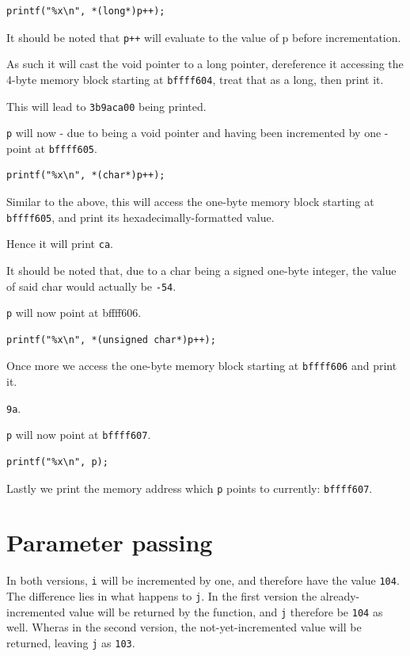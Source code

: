 \documentclass[a4paper]{scrartcl}
\begin{document}
\begin{lstlisting}
printf("%x\n", *(long*)p++);
\end{lstlisting}

It should be noted that \texttt{p++} will evaluate to the value of p before incrementation.

As such it will cast the void pointer to a long pointer, dereference it
accessing the 4-byte memory block starting at \texttt{bffff604}, treat that as
a long, then print it.

This will lead to \texttt{3b9aca00} being printed.

\texttt{p} will now - due to being a void pointer and having been incremented
by one - point at \texttt{bffff605}.

\begin{lstlisting}
printf("%x\n", *(char*)p++);
\end{lstlisting}

Similar to the above, this will access the one-byte memory block starting at
\texttt{bffff605}, and print its hexadecimally-formatted value.

Hence it will print \texttt{ca}.

It should be noted that, due to a char being a signed one-byte integer, the
value of said char would actually be \texttt{-54}. 

\texttt{p} will now point at {bffff606}.

\begin{lstlisting}
printf("%x\n", *(unsigned char*)p++);
\end{lstlisting}

Once more we access the one-byte memory block starting at \texttt{bffff606} and
print it.

\texttt{9a}.

\texttt{p} will now point at \texttt{bffff607}.

\begin{lstlisting}
printf("%x\n", p);
\end{lstlisting}

Lastly we print the memory address which \texttt{p} points to currently:
\texttt{bffff607}.

\section{Parameter passing}

In both versions, \texttt{i} will be incremented by one, and therefore have the
value \texttt{104}. The difference lies in what happens to \texttt{j}. In the
first version the already-incremented value will be returned by the function,
and \texttt{j} therefore be \texttt{104} as well. Wheras in the second version,
the not-yet-incremented value will be returned, leaving \texttt{j} as
\texttt{103}.
\end{document}
